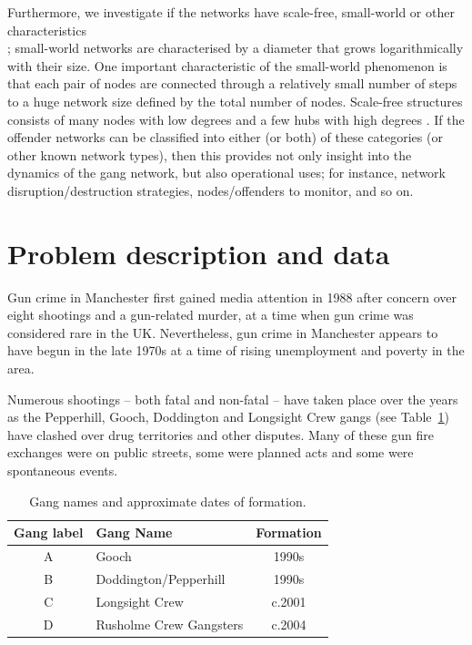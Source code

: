 \documentclass[twocolumn]{svjour3}          %
\theoremstyle{definition}
\begin{document}
Furthermore, we investigate if the networks have scale-free,
small-world or other characteristics\\
\citep{Watts1999,AlbertBarabasi2002,Newman2003}; small-world networks
are characterised by a diameter that grows logarithmically with their
size. One important characteristic of the small-world phenomenon is
that each pair of nodes are connected through a relatively small
number of steps to a huge network size defined by the total number of
nodes. Scale-free structures consists of many nodes with low degrees
and a few hubs with high degrees
\citep{AlbAlbNak04,CostaRodriguesTraviesoVillasBoas2007,Jackson2008}. If
the offender networks can be classified into either (or both) of these
categories (or other known network types), then this provides not only
insight into the dynamics of the gang network, but also operational
uses; for instance, network disruption/destruction strategies,
nodes/offenders to monitor, and so on.


\section{Problem description and data}\label{sec:problemdescription}

Gun crime in Manchester first gained media attention in 1988 after
concern over eight shootings and a gun-related murder, at a time when
gun crime was considered rare in the UK. Nevertheless, gun crime in
Manchester appears to have begun in the late 1970s at a time of rising
unemployment and poverty in the area.

Numerous shootings -- both fatal and non-fatal -- have taken place
over the years as the Pepperhill, Gooch, Doddington and Longsight
Crew gangs (see Table~\ref{table:gangnames}) have clashed over drug
territories and other disputes. Many of these gun fire exchanges were
on public streets, some were planned acts and some were spontaneous
events.

\begin{table}[!ht]
\centering
\begin{tabularx}{\columnwidth}{c X c}
\hline
Gang label & Gang Name & Formation  \\ %
\hline
A & Gooch & 1990s\\
B & Doddington/Pepperhill & 1990s\\
C & Longsight Crew &  c.2001\\
D & Rusholme Crew Gangsters & c.2004\\ %
\hline
\end{tabularx}
\caption{Gang names and approximate dates of formation.}
\label{table:gangnames}
\end{table}
\end{document}

